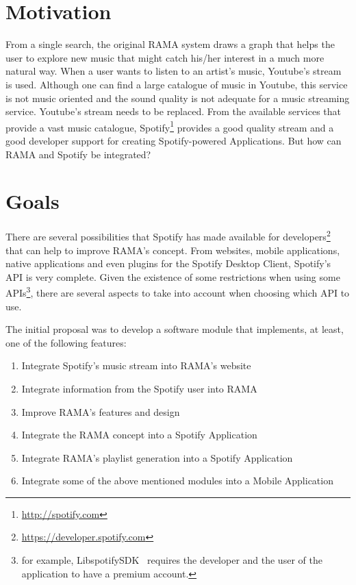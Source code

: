 \section{Motivation} \label{sec:motivation}

  From a single search, the original RAMA system draws a graph that helps the user to explore new music that might catch his/her interest in a much more natural way.
  When a user wants to listen to an artist's music, Youtube's stream is used.
  Although one can find a large catalogue of music in Youtube, this service is not music oriented and the sound quality is not adequate for a music streaming service.
  Youtube's stream needs to be replaced.
  From the available services that provide a vast music catalogue, Spotify\footnote{\url{http://spotify.com}} provides a good quality stream and a good developer support for creating Spotify-powered Applications.
  But how can RAMA and Spotify be integrated?

\section{Goals}
\label{sec:goals}

  There are several possibilities that Spotify has made available for developers\footnote{\url{https://developer.spotify.com}} that can help to improve RAMA's concept.
  From websites, mobile applications, native applications and even plugins for the Spotify Desktop Client, Spotify's API is very complete.
  Given the existence of some restrictions when using some APIs\footnote{for example, LibspotifySDK~\cite{libspotifysdk} requires the developer and the user of the application to have a premium account.}, there are several aspects to take into account when choosing which API to use.

  The initial proposal was to develop a software module that implements, at least, one of the following features:

  \begin{enumerate}
    \item \label{intro:obj1} Integrate Spotify's music stream into RAMA's website
    \item \label{intro:obj2} Integrate information from the Spotify user into RAMA
    \item \label{intro:obj3} Improve RAMA's features and design
    \item \label{intro:obj4} Integrate the RAMA concept into a Spotify Application
    \item \label{intro:obj5} Integrate RAMA's playlist generation into a Spotify Application
    \item \label{intro:obj6} Integrate some of the above mentioned modules into a Mobile Application
  \end{enumerate}

